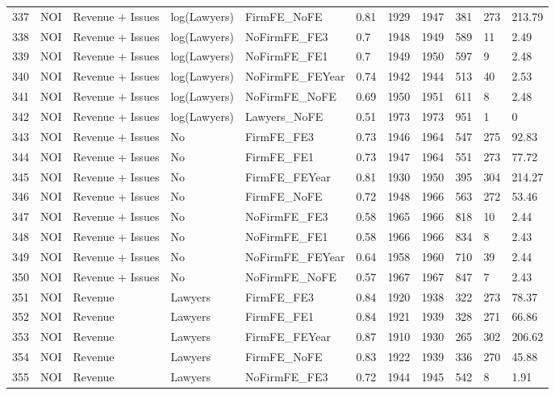 \documentclass{article}
\begin{document}
\begin{table}[H]
\begin{tabular}{rllllllllll}
  337 & NOI & Revenue + Issues & log(Lawyers) & FirmFE\_NoFE & 0.81 & 1929 & 1947 & 381 & 273 & 213.79 \\ 
  338 & NOI & Revenue + Issues & log(Lawyers) & NoFirmFE\_FE3 & 0.7 & 1948 & 1949 & 589 & 11 & 2.49 \\ 
  339 & NOI & Revenue + Issues & log(Lawyers) & NoFirmFE\_FE1 & 0.7 & 1949 & 1950 & 597 & 9 & 2.48 \\ 
  340 & NOI & Revenue + Issues & log(Lawyers) & NoFirmFE\_FEYear & 0.74 & 1942 & 1944 & 513 & 40 & 2.53 \\ 
  341 & NOI & Revenue + Issues & log(Lawyers) & NoFirmFE\_NoFE & 0.69 & 1950 & 1951 & 611 & 8 & 2.48 \\ 
  342 & NOI & Revenue + Issues & log(Lawyers) & Lawyers\_NoFE & 0.51 & 1973 & 1973 & 951 & 1 & 0 \\ 
  343 & NOI & Revenue + Issues & No & FirmFE\_FE3 & 0.73 & 1946 & 1964 & 547 & 275 & 92.83 \\ 
  344 & NOI & Revenue + Issues & No & FirmFE\_FE1 & 0.73 & 1947 & 1964 & 551 & 273 & 77.72 \\ 
  345 & NOI & Revenue + Issues & No & FirmFE\_FEYear & 0.81 & 1930 & 1950 & 395 & 304 & 214.27 \\ 
  346 & NOI & Revenue + Issues & No & FirmFE\_NoFE & 0.72 & 1948 & 1966 & 563 & 272 & 53.46 \\ 
  347 & NOI & Revenue + Issues & No & NoFirmFE\_FE3 & 0.58 & 1965 & 1966 & 818 & 10 & 2.44 \\ 
  348 & NOI & Revenue + Issues & No & NoFirmFE\_FE1 & 0.58 & 1966 & 1966 & 834 & 8 & 2.43 \\ 
  349 & NOI & Revenue + Issues & No & NoFirmFE\_FEYear & 0.64 & 1958 & 1960 & 710 & 39 & 2.44 \\ 
  350 & NOI & Revenue + Issues & No & NoFirmFE\_NoFE & 0.57 & 1967 & 1967 & 847 & 7 & 2.43 \\ 
  351 & NOI & Revenue & Lawyers & FirmFE\_FE3 & 0.84 & 1920 & 1938 & 322 & 273 & 78.37 \\ 
  352 & NOI & Revenue & Lawyers & FirmFE\_FE1 & 0.84 & 1921 & 1939 & 328 & 271 & 66.86 \\ 
  353 & NOI & Revenue & Lawyers & FirmFE\_FEYear & 0.87 & 1910 & 1930 & 265 & 302 & 206.62 \\ 
  354 & NOI & Revenue & Lawyers & FirmFE\_NoFE & 0.83 & 1922 & 1939 & 336 & 270 & 45.88 \\ 
  355 & NOI & Revenue & Lawyers & NoFirmFE\_FE3 & 0.72 & 1944 & 1945 & 542 & 8 & 1.91 \\ 

\end{tabular}
\end{table}
\end{document}
